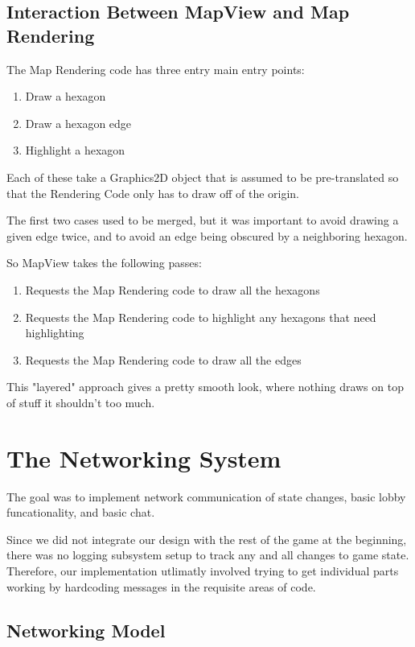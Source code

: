 \documentclass[12pt,a4paper]{article}
\begin{document}
\subsection{Interaction Between MapView and Map Rendering}

The Map Rendering code has three entry main entry points:
\begin{enumerate}
\item{Draw a hexagon}
\item{Draw a hexagon edge}
\item{Highlight a hexagon}
\end{enumerate}

Each of these take a Graphics2D object that is assumed to be pre-translated so
that the Rendering Code only has to draw off of the origin.

The first two cases used to be merged, but it was important to avoid drawing a
given edge twice, and to avoid an edge being obscured by a neighboring hexagon.

So MapView takes the following passes:
\begin{enumerate}
\item{Requests the Map Rendering code to draw all the hexagons}
\item{Requests the Map Rendering code to highlight any hexagons that need highlighting}
\item{Requests the Map Rendering code to draw all the edges}
\end{enumerate}

This "layered" approach gives a pretty smooth look, where nothing draws on top
of stuff it shouldn't too much.
\section{The Networking System}

The goal was to implement network communication of state changes, basic lobby funcationality, and basic chat. 

Since we did not integrate our design with the rest of the game at the beginning, there was no logging subsystem setup to track any and all 
changes to game state. Therefore, our implementation utlimatly involved trying to get individual parts working by hardcoding messages in
the requisite areas of code.

\subsection{Networking Model}
\end{document}
